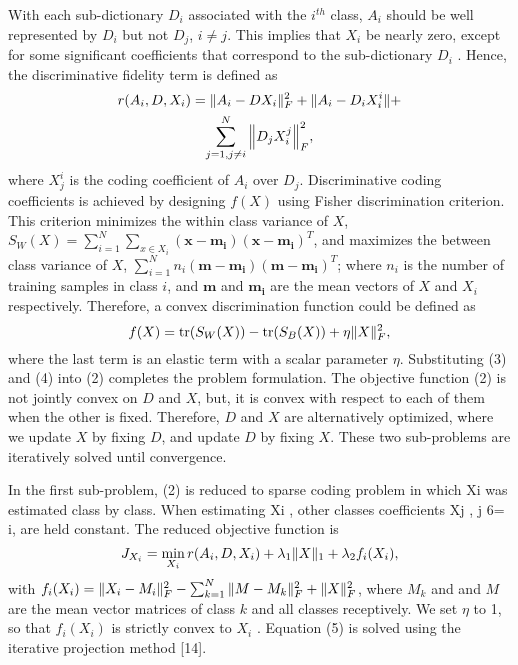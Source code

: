 \documentclass[conference]{IEEEtran}
\begin{document}
	With each sub-dictionary $D_i$ associated with the $i^{th}$ class, $A_i$ should be well represented by $D_i$ but not $D_j$, $i \neq j$. This implies that $X_i$ be nearly zero, except for some significant coefficients that correspond to the sub-dictionary $D_i$ . Hence, the discriminative fidelity term is defined as
	\begin{multline}
		r(A_i,D,X_i)=\Vert{A_i-DX_i}\Vert_F^2+\Vert{A_i-D_iX_i^i}\Vert+ \\
		\sum_{j=1,j\neq i}^{N}\Big\Vert{D_jX_i^j}\Big\Vert_F^2,
	\end{multline}
	where $X_j^i$ is the coding coefficient of $A_i$ over $D_j$. Discriminative coding coefficients is achieved by designing $f(X)$ using Fisher discrimination criterion. This criterion minimizes the within class variance of $X$, $S_W(X)=\sum_{i=1}^{N}\sum_{x\in X_i}(\mathrm{\textbf{x}}-\mathrm{\textbf{m}}_
	\mathrm{\textbf{i}})(\mathrm{\textbf{x}}-\mathrm{\textbf{m}}_\mathrm{\textbf{i}})^T$, and maximizes the between class variance of $X$, $\sum_{i=1}^{N}n_i(\mathrm{\textbf{m}}-\mathrm{\textbf{m}}_\mathrm{\textbf{i}})(\mathrm{\textbf{m}}-\mathrm{\textbf{m}}_\mathrm{\textbf{i}})^T$; where $n_i$ is the number of training samples in class $i$, and $\mathrm{\textbf{m}}$ and $\mathrm{\textbf{m}}_\mathrm{\textbf{i}}$ are the mean vectors
	of $X$ and $X_i$ respectively. Therefore, a convex discrimination
	function could be defined as
	\begin{equation}
		f(X)=\mathrm{tr}(S_W(X))-\mathrm{tr}(S_B(X))+\eta\Vert{X}\Vert_F^2,
	\end{equation}
	where the last term is an elastic term with a scalar parameter $\eta$. Substituting (3) and (4) into (2) completes the problem formulation. The objective function (2) is not jointly convex on $D$ and $X$, but, it is convex with respect to each of them when the other is fixed. Therefore, $D$ and $X$ are alternatively optimized, where we update $X$ by fixing $D$, and update $D$ by fixing $X$. These two sub-problems are iteratively solved until convergence.
	
	In the first sub-problem, (2) is reduced to sparse coding problem in which Xi was estimated class by class. When estimating Xi , other classes coefficients Xj , j 6= i, are held constant. The reduced objective function is
	\begin{equation}
		J_{X_i}=\min_{X_i}r(A_i,D,X_i)+\lambda_1\Vert{X}\Vert_1+\lambda_2f_i(X_i),
	\end{equation}
	with $f_i(X_i)=\Vert{X_i-M_i}\Vert_F^2-\sum_{k=1}^{N}\Vert{M-M_k}\Vert_F^2+\Vert{X}\Vert_F^2$, where $M_k$ and and $M$ are the mean vector matrices of class $k$ and all classes receptively. We set $\eta$ to 1, so that $f_i(X_i)$ is strictly convex to $X_i$ . Equation (5) is solved using the iterative projection method [14].
	
\end{document}
